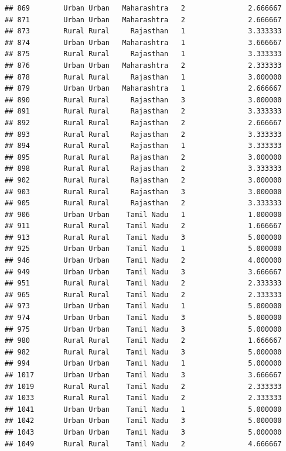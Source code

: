 \documentclass[
]{article}
\begin{document}
\begin{verbatim}
## 869        Urban Urban   Maharashtra   2               2.666667
## 871        Urban Urban   Maharashtra   2               2.666667
## 873        Rural Rural     Rajasthan   1               3.333333
## 874        Urban Urban   Maharashtra   1               3.666667
## 875        Rural Rural     Rajasthan   1               3.333333
## 876        Urban Urban   Maharashtra   2               2.333333
## 878        Rural Rural     Rajasthan   1               3.000000
## 879        Urban Urban   Maharashtra   1               2.666667
## 890        Rural Rural     Rajasthan   3               3.000000
## 891        Rural Rural     Rajasthan   2               3.333333
## 892        Rural Rural     Rajasthan   2               2.666667
## 893        Rural Rural     Rajasthan   2               3.333333
## 894        Rural Rural     Rajasthan   1               3.333333
## 895        Rural Rural     Rajasthan   2               3.000000
## 898        Rural Rural     Rajasthan   2               3.333333
## 902        Rural Rural     Rajasthan   2               3.000000
## 903        Rural Rural     Rajasthan   3               3.000000
## 905        Rural Rural     Rajasthan   2               3.333333
## 906        Urban Urban    Tamil Nadu   1               1.000000
## 911        Rural Rural    Tamil Nadu   2               1.666667
## 913        Rural Rural    Tamil Nadu   3               5.000000
## 925        Urban Urban    Tamil Nadu   1               5.000000
## 946        Urban Urban    Tamil Nadu   2               4.000000
## 949        Urban Urban    Tamil Nadu   3               3.666667
## 951        Rural Rural    Tamil Nadu   2               2.333333
## 965        Rural Rural    Tamil Nadu   2               2.333333
## 973        Urban Urban    Tamil Nadu   1               5.000000
## 974        Urban Urban    Tamil Nadu   3               5.000000
## 975        Urban Urban    Tamil Nadu   3               5.000000
## 980        Rural Rural    Tamil Nadu   2               1.666667
## 982        Rural Rural    Tamil Nadu   3               5.000000
## 994        Urban Urban    Tamil Nadu   1               5.000000
## 1017       Urban Urban    Tamil Nadu   3               3.666667
## 1019       Rural Rural    Tamil Nadu   2               2.333333
## 1033       Rural Rural    Tamil Nadu   2               2.333333
## 1041       Urban Urban    Tamil Nadu   1               5.000000
## 1042       Urban Urban    Tamil Nadu   3               5.000000
## 1043       Urban Urban    Tamil Nadu   3               5.000000
## 1049       Rural Rural    Tamil Nadu   2               4.666667

\end{verbatim}
\end{document}
